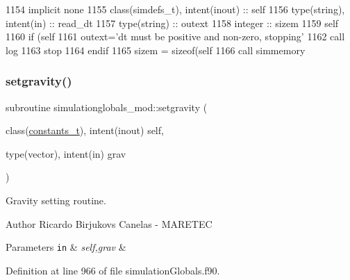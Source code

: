 \begin{DoxyCode}
1154     \textcolor{keywordtype}{implicit none}
1155     \textcolor{keywordtype}{class}(simdefs\_t), \textcolor{keywordtype}{intent(inout)} :: self
1156     \textcolor{keywordtype}{type}(string), \textcolor{keywordtype}{intent(in)} :: read\_dt
1157     \textcolor{keywordtype}{type}(string) :: outext
1158     \textcolor{keywordtype}{integer} :: sizem
1159     self%
1160     \textcolor{keywordflow}{if} (self%
1161         outext=\textcolor{stringliteral}{'dt must be positive and non-zero, stopping'}
1162         \textcolor{keyword}{call }log%
1163         stop
1164 \textcolor{keywordflow}{    endif}
1165     sizem = sizeof(self%
1166     \textcolor{keyword}{call }simmemory%
\end{DoxyCode}
\mbox{\label{namespacesimulationglobals__mod_ae6b88d15ddc389aedd73d600de0337df}} 
\subsubsection{\texorpdfstring{setgravity()}{setgravity()}}
{\footnotesize\ttfamily subroutine simulationglobals\+\_\+mod\+::setgravity (\begin{DoxyParamCaption}\item[{class(\mbox{\hyperlink{structsimulationglobals__mod_1_1constants__t}{constants\+\_\+t}}), intent(inout)}]{self,  }\item[{type(vector), intent(in)}]{grav }\end{DoxyParamCaption})\hspace{0.3cm}{\ttfamily [private]}}



Gravity setting routine. 

\begin{DoxyAuthor}{Author}
Ricardo Birjukovs Canelas -\/ M\+A\+R\+E\+T\+EC 
\end{DoxyAuthor}

\begin{DoxyParams}[1]{Parameters}
\mbox{\tt in}  & {\em self,grav} & \\
\hline
\end{DoxyParams}


Definition at line 966 of file simulation\+Globals.\+f90.


